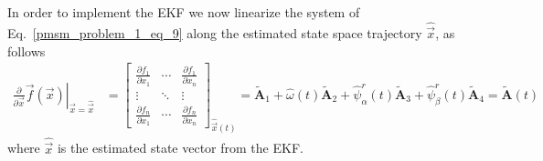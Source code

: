 \documentclass[11pt,a4paper,oneside]{book}
\numberwithin{equation}{section}
\theoremstyle{it}
\theoremstyle{definition}
\begin{document}
\begin{mybox}
	In order to implement the EKF we now linearize the system of Eq.~\eqref{pmsm_problem_1_eq_9} along the estimated state space trajectory $\hat{\vec{x}}$, as follows
	\begin{equation}\label{pmsm_problem_1_eq_10}
		\begin{aligned}
			\left.\frac{\partial}{\partial 
				\vec{x}}\vec{f}(\vec{x})\right|_{\vec{x}=\hat{\vec{x}}} &= 
			\begin{bmatrix} \frac{\partial f_1}{\partial x_1} & \cdots & 
				\frac{\partial f_1}{\partial x_n} \\[6pt]
				\vdots & \ddots & \vdots \\[6pt]
				\frac{\partial f_n}{\partial x_1} & \cdots & \frac{\partial 
					f_n}{\partial x_n}
			\end{bmatrix}_{\hat{\vec{x}}(t)} = \tilde{\mathbf{A}}_1 + 
			\hat{\omega}(t) \tilde{\mathbf{A}}_2 + \hat{\psi}_\alpha^r(t) 
			\tilde{\mathbf{A}}_3 + \hat{\psi}_\beta^r(t) \tilde{\mathbf{A}}_4 = 
			\tilde{\mathbf{A}}(t)
		\end{aligned}
	\end{equation} 
	where $\hat{\vec{x}}$ is the estimated state vector from the EKF.
\end{mybox}
\end{document}
